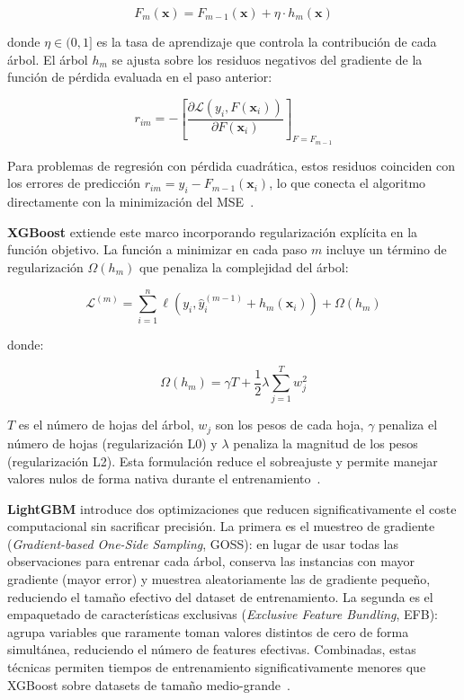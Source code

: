 \documentclass[12pt, a4paper]{article}
\begin{document}
\begin{equation}
F_m(\mathbf{x}) = F_{m-1}(\mathbf{x}) + \eta \cdot h_m(\mathbf{x})
\end{equation}

donde $\eta \in (0,1]$ es la tasa de aprendizaje que controla la contribución de cada árbol. El árbol $h_m$ se ajusta sobre los residuos negativos del gradiente de la función de pérdida evaluada en el paso anterior:

\begin{equation}
r_{im} = -\left[\frac{\partial \mathcal{L}(y_i, F(\mathbf{x}_i))}{\partial F(\mathbf{x}_i)}\right]_{F=F_{m-1}}
\end{equation}

Para problemas de regresión con pérdida cuadrática, estos residuos coinciden con los errores de predicción $r_{im} = y_i - F_{m-1}(\mathbf{x}_i)$, lo que conecta el algoritmo directamente con la minimización del MSE~\cite{chen2016}.

\textbf{XGBoost} extiende este marco incorporando regularización explícita en la función objetivo. La función a minimizar en cada paso $m$ incluye un término de regularización $\Omega(h_m)$ que penaliza la complejidad del árbol:

\begin{equation}
\mathcal{L}^{(m)} = \sum_{i=1}^{n} \ell(y_i, \hat{y}_i^{(m-1)} + h_m(\mathbf{x}_i)) + \Omega(h_m)
\end{equation}

donde:

\begin{equation}
\Omega(h_m) = \gamma T + \frac{1}{2}\lambda \sum_{j=1}^{T} w_j^2
\end{equation}

$T$ es el número de hojas del árbol, $w_j$ son los pesos de cada hoja, $\gamma$ penaliza el número de hojas (regularización L0) y $\lambda$ penaliza la magnitud de los pesos (regularización L2). Esta formulación reduce el sobreajuste y permite manejar valores nulos de forma nativa durante el entrenamiento~\cite{chen2016}.

\textbf{LightGBM} introduce dos optimizaciones que reducen significativamente el coste computacional sin sacrificar precisión. La primera es el muestreo de gradiente (\textit{Gradient-based One-Side Sampling}, GOSS): en lugar de usar todas las observaciones para entrenar cada árbol, conserva las instancias con mayor gradiente (mayor error) y muestrea aleatoriamente las de gradiente pequeño, reduciendo el tamaño efectivo del dataset de entrenamiento. La segunda es el empaquetado de características exclusivas (\textit{Exclusive Feature Bundling}, EFB): agrupa variables que raramente toman valores distintos de cero de forma simultánea, reduciendo el número de features efectivas. Combinadas, estas técnicas permiten tiempos de entrenamiento significativamente menores que XGBoost sobre datasets de tamaño medio-grande~\cite{ke2017}.
\end{document}
